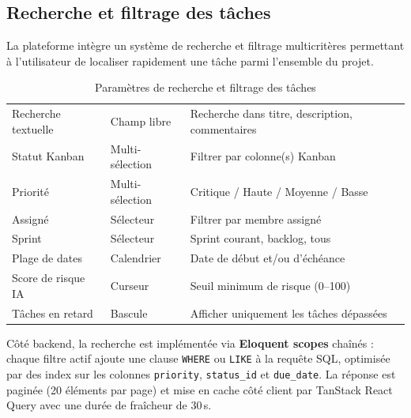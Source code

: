 \subsection{Recherche et filtrage des tâches}

La plateforme intègre un système de recherche et filtrage multicritères permettant
à l'utilisateur de localiser rapidement une tâche parmi l'ensemble du projet.

\begin{table}[H]
  \centering
  \caption{Paramètres de recherche et filtrage des tâches}
  \label{tab:filtres_taches}
  \begin{tabularx}{\textwidth}{L{4cm}L{3.5cm}X}
    \toprule
     &  &  \\
    \midrule
    Recherche textuelle  & Champ libre     & Recherche dans titre, description, commentaires \\
    Statut Kanban        & Multi-sélection & Filtrer par colonne(s) Kanban \\
    Priorité             & Multi-sélection & Critique / Haute / Moyenne / Basse \\
    Assigné              & Sélecteur       & Filtrer par membre assigné \\
    Sprint               & Sélecteur       & Sprint courant, backlog, tous \\
    Plage de dates       & Calendrier      & Date de début et/ou d'échéance \\
    Score de risque IA   & Curseur         & Seuil minimum de risque (0--100) \\
    Tâches en retard     & Bascule         & Afficher uniquement les tâches dépassées \\
    \bottomrule
  \end{tabularx}
\end{table}

Côté backend, la recherche est implémentée via \textbf{Eloquent scopes} chaînés :
chaque filtre actif ajoute une clause \texttt{WHERE} ou \texttt{LIKE} à la requête
SQL, optimisée par des index sur les colonnes \texttt{priority}, \texttt{status\_id}
et \texttt{due\_date}. La réponse est paginée (20 éléments par page) et mise en
cache côté client par TanStack React Query avec une durée de fraîcheur de 30\,s.

